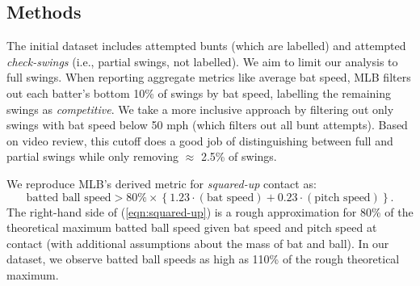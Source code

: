 \documentclass{article}
\begin{document}
\subsection*{Methods}

The initial dataset includes attempted bunts (which are labelled) and attempted {\it check-swings} (i.e., partial swings, not labelled). We aim to limit our analysis to full swings. When reporting aggregate metrics like average bat speed, MLB filters out each batter's bottom 10\% of swings by bat speed, labelling the remaining swings as {\it competitive}. We take a more inclusive approach by filtering out only swings with bat speed below 50 mph (which filters out all bunt attempts). Based on video review, this cutoff does a good job of distinguishing between full and partial swings while only removing $\approx$ 2.5\% of swings.

We reproduce MLB's derived metric for {\it squared-up} contact as:
\begin{equation}
  \label{eqn:squared-up}
  \mbox{batted ball speed} > 80\% \times \left\{1.23 \cdot (\mbox{bat speed}) + 0.23 \cdot (\mbox{pitch speed})\right\}.
\end{equation}
The right-hand side of (\ref{eqn:squared-up}) is a rough approximation for 80\% of the theoretical maximum batted ball speed given bat speed and pitch speed at contact (with additional assumptions about the mass of bat and ball). In our dataset, we observe batted ball speeds as high as 110\% of the rough theoretical maximum.
\end{document}
